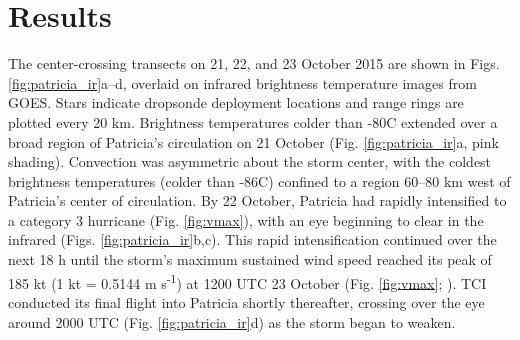 \section{Results}

The center-crossing transects on 21, 22, and 23 October 2015 are shown in Figs. \ref{fig:patricia_ir}a--d, overlaid on infrared brightness temperature images from GOES.
Stars indicate dropsonde deployment locations and range rings are plotted every 20 km.
Brightness temperatures colder than -80\textdegree{}C extended over a broad region of Patricia’s circulation on 21 October (Fig. \ref{fig:patricia_ir}a, pink shading).
Convection was asymmetric about the storm center, with the coldest brightness temperatures (colder than -86\textdegree{}C) confined to a region 60–80 km west of Patricia’s center of circulation.
By 22 October, Patricia had rapidly intensified to a category 3 hurricane (Fig. \ref{fig:vmax}), with an eye beginning to clear in the infrared (Figs. \ref{fig:patricia_ir}b,c).
This rapid intensification continued over the next 18 h until the storm’s maximum sustained wind speed reached its peak
of 185 kt (1 kt = 0.5144 m s\textsuperscript{-1}) at 1200 UTC 23 October (Fig. \ref{fig:vmax}; \citeauthor{Kimberlainetal2016} \citeyear{Kimberlainetal2016}).
TCI conducted its final flight into Patricia shortly thereafter, crossing over the eye around 2000 UTC (Fig. \ref{fig:patricia_ir}d) as the storm began to weaken.

